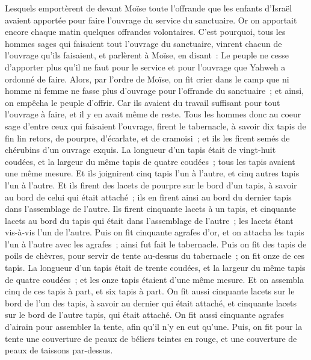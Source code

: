 \begin{multicols}{2}
Lesquels emportèrent de devant Moïse toute l'offrande que les enfants d'Israël avaient apportée pour faire l'ouvrage du service du sanctuaire. Or on apportait encore chaque matin quelques offrandes volontaires.
C'est pourquoi, tous les hommes sages qui faisaient tout l'ouvrage du sanctuaire, vinrent chacun de l'ouvrage qu'ils faisaient,
et parlèrent à Moïse, en disant~: Le peuple ne cesse d'apporter plus qu'il ne faut pour le service et pour l'ouvrage que Yahweh a ordonné de faire.
Alors, par l'ordre de Moïse, on fit crier dans le camp que ni homme ni femme ne fasse plus d'ouvrage pour l'offrande du sanctuaire~; et ainsi, on empêcha le peuple d'offrir.
Car ils avaient du travail suffisant pour tout l'ouvrage à faire, et il y en avait même de reste.
Tous les hommes donc au coeur sage d'entre ceux qui faisaient l'ouvrage, firent le tabernacle, à savoir dix tapis de fin lin retors, de pourpre, d'écarlate, et de cramoisi~; et ils les firent semés de chérubins d'un ouvrage exquis.
La longueur d'un tapis était de vingt-huit coudées, et la largeur du même tapis de quatre coudées~; tous les tapis avaient une même mesure.
Et ils joignirent cinq tapis l'un à l'autre, et cinq autres tapis l'un à l'autre.
Et ils firent des lacets de pourpre sur le bord d'un tapis, à savoir au bord de celui qui était attaché~; ils en firent ainsi au bord du dernier tapis dans l'assemblage de l'autre.
Ils firent cinquante lacets à un tapis, et cinquante lacets au bord du tapis qui était dans l'assemblage de l'autre~; les lacets étant vis-à-vis l'un de l'autre.
Puis on fit cinquante agrafes d'or, et on attacha les tapis l'un à l'autre avec les agrafes~; ainsi fut fait le tabernacle.
Puis on fit des tapis de poils de chèvres, pour servir de tente au-dessus du tabernacle~; on fit onze de ces tapis.
La longueur d'un tapis était de trente coudées, et la largeur du même tapis de quatre coudées~; et les onze tapis étaient d'une même mesure.
Et on assembla cinq de ces tapis à part, et six tapis à part.
On fit aussi cinquante lacets sur le bord de l'un des tapis, à savoir au dernier qui était attaché, et cinquante lacets sur le bord de l'autre tapis, qui était attaché.
On fit aussi cinquante agrafes d'airain pour assembler la tente, afin qu'il n'y en eut qu'une.
Puis, on fit pour la tente une couverture de peaux de béliers teintes en rouge, et une couverture de peaux de taissons par-dessus.

\end{multicols}
